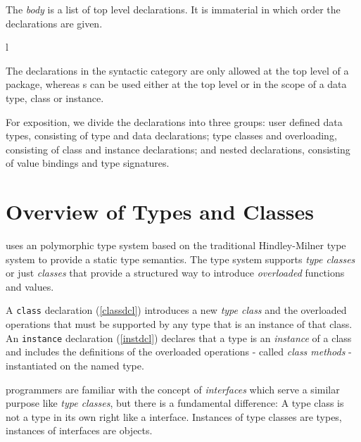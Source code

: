 
The \emph{body} is a list of top level declarations. It is immaterial in which order the declarations are given.

l%

The declarations in the syntactic category  are only allowed at the top level of a \frege{} package, whereas s can be used either at the top level or in the scope of a data type, class or instance.

For exposition, we divide the declarations into three groups: user defined data types, consisting of type and data declarations; type classes and overloading, consisting of class and instance declarations; and nested declarations, consisting of value bindings and type signatures.

\section{Overview of Types and Classes}
\frege{} uses an polymorphic type system based on the traditional Hindley-Milner type system \cite{ptifart} to provide a static type semantics. The type system supports \emph{type classes} or just \emph{classes} that provide a structured way to introduce \emph{overloaded} functions and values.

A \texttt{class} declaration (\autoref{classdcl}) introduces a new \emph{type class} and the overloaded operations that must be supported by any type that is an instance of that class. An \texttt{instance} declaration (\autoref{instdcl}) declares that a type is an \emph{instance} of a class and includes the definitions of the overloaded operations - called \emph{class methods} - instantiated on the named type.  

\java{} programmers are familiar with the concept of \emph{interfaces} which serve a similar purpose like \emph{type classes}, but there is a fundamental difference: A \frege{} type class is not a type in its own right like a \java{} interface. Instances of type classes are types, instances of \java{} interfaces are objects.

